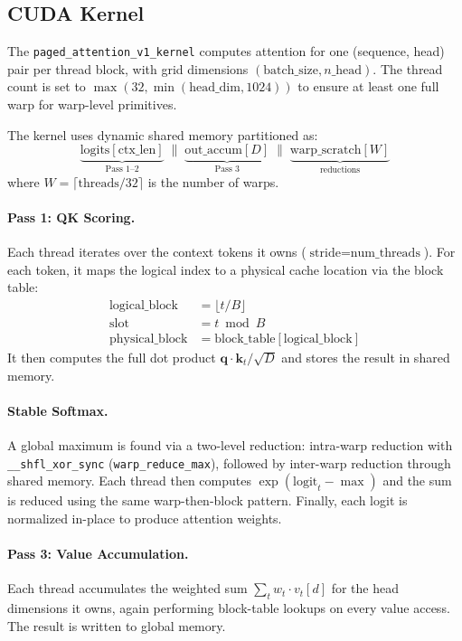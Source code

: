 \documentclass{article}
\begin{document}
\subsection{CUDA Kernel}
\label{sec:kernel}

The \texttt{paged\_attention\_v1\_kernel} computes attention for one (sequence, head) pair per thread block, with grid dimensions $(\text{batch\_size}, n\_\text{head})$.
The thread count is set to $\max(32, \min(\text{head\_dim}, 1024))$ to ensure at least one full warp for warp-level primitives.

The kernel uses dynamic shared memory partitioned as:
\[
\underbrace{\text{logits}[\text{ctx\_len}]}_{\text{Pass 1--2}} \;\|\; \underbrace{\text{out\_accum}[D]}_{\text{Pass 3}} \;\|\; \underbrace{\text{warp\_scratch}[W]}_{\text{reductions}}
\]
where $W = \lceil \text{threads} / 32 \rceil$ is the number of warps.

\paragraph{Pass 1: QK Scoring.}
Each thread iterates over the context tokens it owns ($\text{stride} = \text{num\_threads}$).
For each token, it maps the logical index to a physical cache location via the block table:
\begin{align*}
\text{logical\_block} &= \lfloor t / B \rfloor \\
\text{slot} &= t \bmod B \\
\text{physical\_block} &= \text{block\_table}[\text{logical\_block}]
\end{align*}
It then computes the full dot product $\mathbf{q} \cdot \mathbf{k}_t / \sqrt{D}$ and stores the result in shared memory.

\paragraph{Stable Softmax.}
A global maximum is found via a two-level reduction: intra-warp reduction with \texttt{\_\_shfl\_xor\_sync} (\texttt{warp\_reduce\_max}), followed by inter-warp reduction through shared memory.
Each thread then computes $\exp(\text{logit}_t - \max)$ and the sum is reduced using the same warp-then-block pattern.
Finally, each logit is normalized in-place to produce attention weights.

\paragraph{Pass 3: Value Accumulation.}
Each thread accumulates the weighted sum $\sum_t w_t \cdot v_t[d]$ for the head dimensions it owns, again performing block-table lookups on every value access.
The result is written to global memory.
\end{document}
